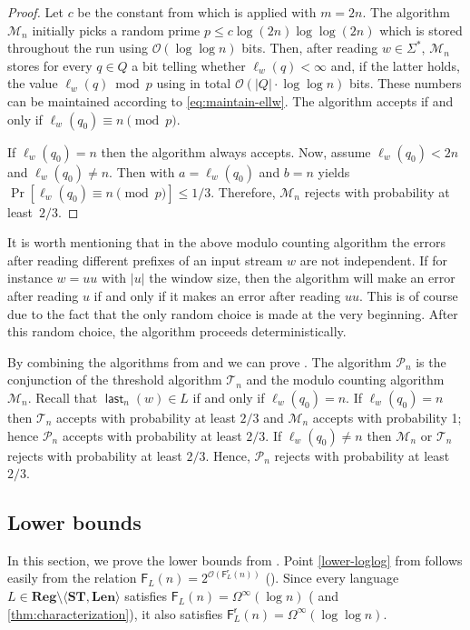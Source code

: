 \documentclass{theoretics}
\newcommand{\M}{\mathcal{M}}
\renewcommand{\O}{\mathcal{O}}
\renewcommand{\P}{\mathcal{P}}
\newcommand{\F}{\mathsf{F}}
\renewcommand{\r}{\mathsf{r}}
\DeclareMathOperator{\last}{\mathsf{last}}
\newcommand{\Reg}{\mathbf{Reg}}
\newcommand{\Len}{\mathbf{Len}}
\newcommand{\ST}{\mathbf{ST}}
\renewcommand{\leq}{\leqslant}
\newcommand{\Omegainf}{\Omega^{\scriptscriptstyle{\infty}}}
\begin{document}
\begin{proof}
Let $c$ be the constant from  which is applied with $m = 2n$.
The algorithm $\M_n$ initially picks a random prime $p   \leq c \log(2n) \log \log(2n)$
which is stored throughout the run using $\O(\log \log n)$ bits.
Then, after reading  $w \in \Sigma^*$, $\M_n$ stores for every $q \in Q$ a bit telling whether
$\ell_w(q) < \infty$ and, if the latter holds,
the value $\ell_w(q) \bmod p$ using in total $\O(|Q| \cdot \log \log n)$ bits.
These numbers can be maintained according to \eqref{eq:maintain-ellw}.
The algorithm accepts if and only if $\ell_w(q_0) \equiv n \pmod p$.

If $\ell_w(q_0) = n$ then the algorithm always accepts.
Now, assume $\ell_w(q_0) < 2n$ and $\ell_w(q_0) \neq n$.
Then   with $a = \ell_w(q_0)$ and $b = n$ yields
$\Pr[\ell_w(q_0) \equiv n \pmod p] \leq 1/3$.
Therefore, $\M_n$ rejects with probability at least~$2/3$.
\end{proof}
It is worth mentioning that in the above modulo counting algorithm
the errors after reading different prefixes of an input stream $w$ are not independent.
If for instance $w = uu$ with $|u|$ the window size, then the algorithm will make an
 error after reading $u$ if and only if it makes an error after reading $uu$.
 This is of course due to the fact that the only random
choice is made at the very beginning. After this random choice, the algorithm proceeds deterministically.


By combining the algorithms from  and   we can prove .
The algorithm $\P_n$ is the conjunction of the threshold algorithm $\mathcal{T}_n$
and the modulo counting algorithm~$\M_n$.
Recall that $\last_n(w) \in L$ if and only if $\ell_{w}(q_0) = n$.
If $\ell_{w}(q_0) = n$ then $\mathcal{T}_n$ accepts with probability at least $2/3$ and
$\M_n$ accepts with probability 1; hence $\P_n$ accepts with probability at least $2/3$.
If $\ell_{w}(q_0) \neq n$ then $\M_n$ or $\mathcal{T}_n$ rejects with probability at least $2/3$.
Hence, $\P_n$ rejects with probability at least~$2/3$.

\subsection{Lower bounds} \label{sec-CC}

In this section, we prove the lower bounds from .
Point \ref{lower-loglog} from  follows easily from
the relation $\F_L(n) = 2^{\O(\F^\r_L(n))}$ ().
Since every language $L \in \Reg \setminus \langle \ST, \Len \rangle$
satisfies $\F_L(n) = \Omegainf(\log n)$
( and \ref{thm:characterization}),
it also satisfies $\F^\r_L(n) = \Omegainf(\log \log n)$.
\end{document}
